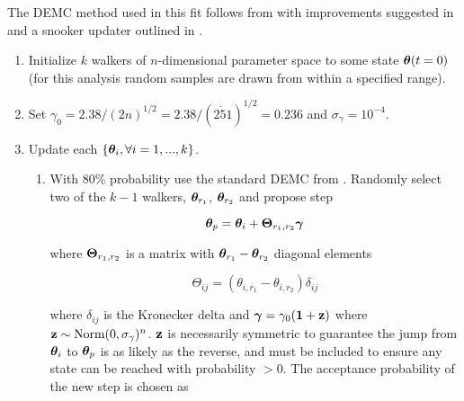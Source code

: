 The DEMC method used in this fit follows from
 with improvements suggested in  and a snooker updater outlined in .

\begin{enumerate}
\item Initialize $k$ walkers of $n$-dimensional parameter space to some state $\boldsymbol{\theta}(t = 0)$ (for this analysis random samples
are drawn from within a specified range).

\item Set $\gamma_0 = 2.38 / (2 n)^{1/2} = 2.38 / (2 \dot 51)^{1/2} = 0.236$ and $\sigma_{\gamma} = 10^{-4}$.

\item \label{itm:update_demc} Update each $\{\boldsymbol{\theta}_i, \forall i = 1, ..., k\}$.
\begin{enumerate}
\item \label{itm:update_demc_normal} With 80\% probability use the standard DEMC from .  Randomly
select two of the $k - 1$ walkers, $\boldsymbol{\theta}_{r_1}$, $\boldsymbol{\theta}_{r_2}$ and propose step

\vspace{-10pt}

\begin{equation}
\boldsymbol{\theta}_p = \boldsymbol{\theta}_i + \boldsymbol{\Theta}_{r_1, r_2} \boldsymbol{\gamma}
\label{eq:elifetime_fit_mcmc_update_demc}
\end{equation}

\noindent where $\boldsymbol{\Theta}_{r_1, r_2}$ is a matrix with $\boldsymbol{\theta}_{r_1} - \boldsymbol{\theta}_{r_2}$ diagonal
elements

\vspace{-10pt}

\begin{equation}
\Theta_{ij} = (\theta_{i, r_1} - \theta_{i, r_2}) \delta_{ij}
\end{equation}

\noindent where $\delta_{ij}$ is the Kronecker delta  and $\boldsymbol{\gamma} = \gamma_0 (\mathbf{1} + \mathbf{z})$ where
$\mathbf{z} \sim \mathrm{Norm}(0, \sigma_{\gamma})^n$.  $\mathbf{z}$ is necessarily symmetric to guarantee the jump from
$\boldsymbol{\theta}_i$ to $\boldsymbol{\theta}_p$ is as likely as the reverse, and must be included to ensure any state can be reached with
probability $> 0$.  The acceptance probability of the new step is chosen as

\vspace{-20pt}


\end{enumerate}
\end{enumerate}
